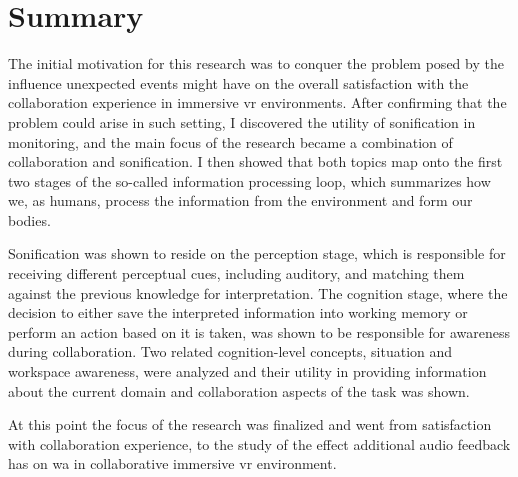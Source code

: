 
\chapter{Summary}

The initial motivation for this research was to conquer the problem posed by the influence unexpected events might have on the overall satisfaction with the collaboration experience in immersive \gls{vr} environments.
After confirming that the problem could arise in such setting, I discovered the utility of sonification in monitoring, and the main focus of the research became a combination of collaboration and sonification. I then showed that both topics map onto the first two stages of the so-called information processing loop, which summarizes how we, as humans, process the information from the environment and form our bodies.

Sonification was shown to reside on the perception stage, which is responsible for receiving different perceptual cues, including auditory, and matching them against the previous knowledge for interpretation. The cognition stage, where the decision to either save the interpreted information into working memory or perform an action based on it is taken, was shown to be responsible for awareness during collaboration. 
Two related cognition-level concepts, situation and workspace awareness, were analyzed and their utility in providing information about the current domain and collaboration aspects of the task was shown.

At this point the focus of the research was finalized and went from satisfaction with collaboration experience, to the study of the effect additional audio feedback has on \gls{wa} in collaborative immersive \gls{vr} environment.

